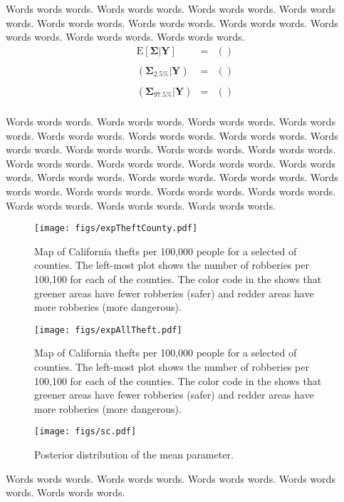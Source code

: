 \documentclass{../../tex_template/asaproc}
\newcommand{\p}[1]{\left(#1\right)}
\newcommand{\E}{ \text{E} }
\begin{document}
Words words words.  Words words words.  Words words words.  Words words words.  Words words words.
Words words words.  Words words words.  Words words words.  Words words words.  Words words words.
\[
\begin{array}{lll}
  \E[\bm\Sigma | \bm Y] &=& \p{} \\
    \\
  (\bm\Sigma_{2.5\%}| \bm Y) &=& \p{} \\
    \\
    (\bm\Sigma_{97.5\%} | \bm Y) &=& \p{} \\
\end{array}
\]



Words words words.  Words words words.  Words words words.  Words words words.  Words words words.
Words words words.  Words words words.  Words words words.  Words words words.  Words words words.
Words words words.  Words words words.  Words words words.  Words words words.  Words words words.
Words words words.  Words words words.  Words words words.  Words words words.  Words words words.
Words words words.  Words words words.  Words words words.  Words words words.  Words words words.


\begin{figure*}
  \centering
  \texttt{[image: figs/expTheftCounty.pdf]}
  \caption{Map of California thefts per 100,000 people for a selected of counties. The left-most plot
  shows the number of robberies per 100,100 for each of the counties. The color code in the shows that
greener areas have fewer robberies (safer) and redder areas have more robberies (more dangerous).}
  \label{fig:eachtheft}
\end{figure*}

\begin{figure*}
  \centering
  \texttt{[image: figs/expAllTheft.pdf]}
  \caption{Map of California thefts per 100,000 people for a selected of counties. The left-most plot
  shows the number of robberies per 100,100 for each of the counties. The color code in the shows that
greener areas have fewer robberies (safer) and redder areas have more robberies (more dangerous).}
  \label{fig:alltheft}
\end{figure*}



\begin{figure}
  \centering
  \texttt{[image: figs/sc.pdf]}
  \caption{Posterior distribution of the mean parameter.}
  \label{fig:scprob}
\end{figure}

Words words words.  Words words words.  Words words words.  Words words words.  Words words words.
\end{document}
